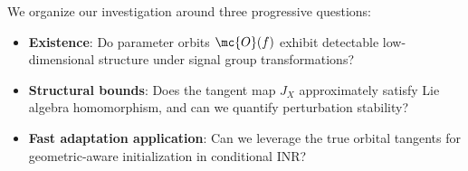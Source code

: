 We organize our investigation around three progressive questions:

\begin{itemize}
    \item[\textbf{A.}] \textbf{Existence}: Do parameter orbits $\mc{O}(f)$ exhibit detectable low-dimensional structure under signal group transformations?

    \item[\textbf{B.}] \textbf{Structural bounds}: Does the tangent map $J_X$ approximately satisfy Lie algebra homomorphism, and can we quantify perturbation stability?

    \item[\textbf{C.}] \textbf{Fast adaptation application}: Can we leverage the true orbital tangents for geometric-aware initialization in conditional INR?
\end{itemize}
